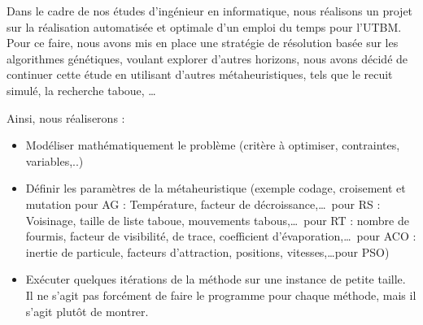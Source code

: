 

Dans le cadre de nos études d'ingénieur en informatique, nous réalisons un projet sur la réalisation automatisée et optimale d'un emploi du temps pour l'\gls{UTBM}\cite{TimeTableScheduling}.
Pour ce faire, nous avons mis en place une stratégie de résolution basée sur les algorithmes génétiques\cite{burke1994genetic}, voulant explorer d'autres horizons, nous avons décidé de continuer cette étude en utilisant d'autres métaheuristiques, tels que le recuit simulé, la recherche taboue, \ldots\

Ainsi, nous réaliserons :
\begin{itemize}
    \item Modéliser mathématiquement le problème (critère à optimiser, contraintes, variables,..)
    \item Définir les paramètres de la métaheuristique (exemple codage, croisement et mutation pour AG : Température, facteur de décroissance,\ldots\ pour RS : Voisinage, taille de liste taboue, mouvements tabous,\ldots\ pour RT : nombre de fourmis, facteur de visibilité, de trace, coefficient d'évaporation,\ldots\ pour ACO : inertie de particule, facteurs d'attraction, positions, vitesses,\ldots pour PSO)
    \item Exécuter quelques itérations de la méthode sur une instance de petite taille.
    Il ne s’agit pas forcément de faire le programme pour chaque méthode, mais il s’agit plutôt de montrer.
\end{itemize}

